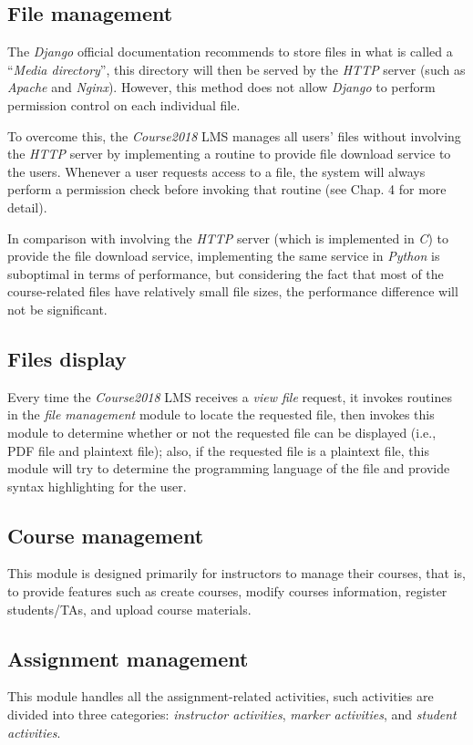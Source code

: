\subsection{File management}
The \emph{Django} official documentation recommends to store files in what is
called a ``\emph{Media directory}'', this directory will then be served by the
\emph{HTTP} server \cite{djangoManagingFiles}
(such as \emph{Apache} and \emph{Nginx}). However, this method does not allow
\emph{Django} to perform permission control on each individual file.

\medskip

To overcome this, the \emph{Course2018} LMS manages all users' files without
involving the \emph{HTTP} server by implementing a routine to provide file
download service to the users. Whenever a user requests access to a file, the system
will always perform a permission check before invoking that routine
(see Chap. 4 for more detail).

\medskip

In comparison with
involving the \emph{HTTP} server (which is implemented in \emph{C}) to provide
the file download service,
implementing the same service in \emph{Python} is suboptimal in terms of
performance, 
but considering the fact that most of the course-related
files have relatively small file sizes, the performance difference will
not be significant.

\subsection{Files display}
Every time the \emph{Course2018} LMS receives a \emph{view file} request,
it invokes routines in the \emph{file management} module to locate the
requested file, then invokes this module to determine whether or not the
requested file can be displayed (i.e., PDF file and plaintext file); also,
if the requested file is a plaintext file, this module will try to determine
the programming language of the file and provide syntax highlighting for the
user.

\subsection{Course management}
This module is designed primarily for instructors to manage their courses, 
that is, to provide features such as create courses, modify courses information,
register students/TAs, and upload course materials.

\subsection{Assignment management}
This module handles all the assignment-related activities, such activities are
divided into three categories: \emph{instructor activities}, 
\emph{marker activities}, and \emph{student activities}.

